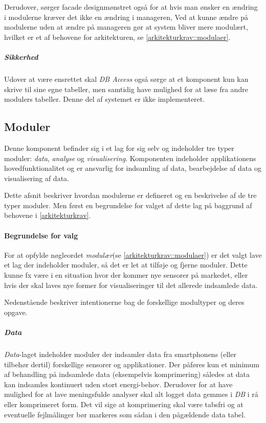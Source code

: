 Derudover, sørger facade designmønstret også for at hvis man ønsker en ændring i modulerne kræver det ikke en ændring i manageren,
Ved at kunne ændre på modulerne uden at ændre på manageren gør at system bliver mere modulært, hvilket er et af behovene for arkitekturen, se \cref{arkitekturkrav::modulaer}.

\subparagraph{Sikkerhed}
Udover at være ensrettet skal \textit{DB Access} også sørge at et komponent kun kan skrive til sine egne tabeller, men samtidig have mulighed for at læse fra andre modulers tabeller.
Denne del af systemet er ikke implementeret.

\subsection{Moduler}
Denne komponent befinder sig i et lag for sig selv og indeholder tre typer moduler: \textit{data}, \textit{analyse} og \textit{visualisering}.
Komponenten indeholder applikationens hovedfunktionalitet og er ansvarlig for indsamling af data, bearbejdelse af data og visualisering af data.

Dette afsnit beskriver hvordan modulerne er defineret og en beskrivelse af de tre typer moduler.
Men først en begrundelse for valget af dette lag på baggrund af behovene i \cref{arkitekturkrav}.

\paragraph{Begrundelse for valg}
For at opfylde nøgleordet \textit{modulær}(se \cref{arkitekturkrav::modulaer}) er det valgt lave et lag der indeholder moduler, så det er let at tilføje og fjerne moduler.
Dette kunne fx være i en situation hvor der kommer nye sensorer på markedet, eller hvis der skal laves nye former for visualiseringer til det allerede indsamlede data.

Nedenstående beskriver intentionerne bag de forskellige modultyper og deres opgave.

\subparagraph{Data}
\textit{Data}-laget indeholder moduler der indsamler data fra smartphonens (eller tilbehør dertil) forskellige sensorer og applikationer.
Der påføres kun et minimum af behandling på indsamlede data (eksempelvis komprimering) således at data kan indsamles kontinuert uden stort energi-behov.
Derudover for at have mulighed for at lave meningsfulde analyser skal alt logget data gemmes i \textit{DB} i rå eller komprimeret form.
Det vil sige at komprimering skal være tabsfri og at eventuelle fejlmålinger bør markeres som sådan i den pågældende data tabel.

